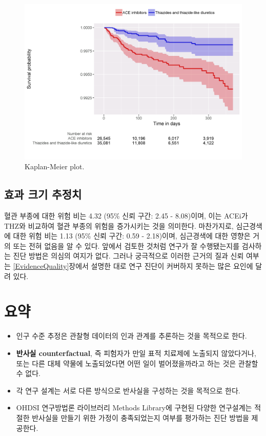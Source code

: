 \documentclass[10.5pt]{book}
\theoremstyle{definition}
\theoremstyle{definition}
\theoremstyle{definition}
\theoremstyle{remark}
\let\BeginKnitrBlock\begin \let\EndKnitrBlock\end
\begin{document}
\begin{figure}

{\centering \includegraphics[width=1\linewidth]{images/PopulationLevelEstimation/kmPlot} 

}

\caption{Kaplan-Meier plot.}\label{fig:kmPlot}
\end{figure}

\subsection{효과 크기 추정치}\label{--}

혈관 부종에 대한 위험 비는 4.32 (95\% 신뢰 구간: 2.45 - 8.08)이며, 이는
ACEi가 THZ와 비교하여 혈관 부종의 위험을 증가시키는 것을 의미한다.
마찬가지로, 심근경색에 대한 위험 비는 1.13 (95\% 신뢰 구간: 0.59 -
2.18)이며, 심근경색에 대한 영향은 거의 또는 전혀 없음을 알 수 있다.
앞에서 검토한 것처럼 연구가 잘 수행됐는지를 검사하는 진단 방법은 의심의
여지가 없다. 그러나 궁극적으로 이러한 근거의 질과 신뢰 여부는
\ref{EvidenceQuality}장에서 설명한 대로 연구 진단이 커버하지 못하는 많은
요인에 달려 있다.

\section{요약}\label{-10}

\BeginKnitrBlock{rmdsummary}
\begin{itemize}
\item
  인구 수준 추정은 관찰형 데이터의 인과 관계를 추론하는 것을 목적으로
  한다.
\item
  \textbf{반사실 counterfactual}, 즉 피험자가 만일 표적 치료제에
  노출되지 않았다거나, 또는 다른 대체 약물에 노출되었다면 어떤 일이
  벌어졌을까라고 하는 것은 관찰할 수 없다.
\item
  각 연구 설계는 서로 다른 방식으로 반사실을 구성하는 것을 목적으로
  한다.
\item
  OHDSI 연구방법론 라이브러리 Methods Library에 구현된 다양한 연구설계는
  적절한 반사실을 만들기 위한 가정이 충족되었는지 여부를 평가하는 진단
  방법을 제공한다.
\end{itemize}
\EndKnitrBlock{rmdsummary}
\end{document}
